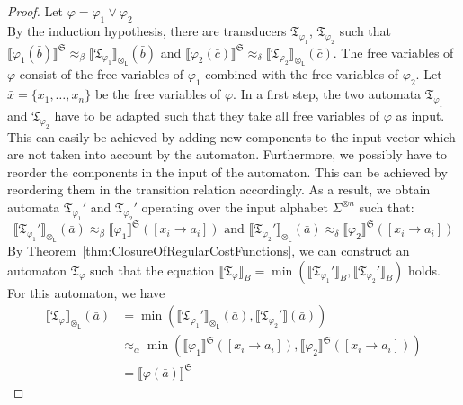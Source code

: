 \documentclass{LMCS}
\newcommand{\automatonT}{\mathfrak T}
\newcommand{\semantics}[1]{\llbracket#1\rrbracket}
\newcommand{\costEquiv}[1][\alpha]{\approx_{#1}}
\newcommand{\padprodL}{\otimes_{\mathsf{L}}}
\newcommand{\alphVector}[2]{#1^{\otimes #2}}
\newcommand{\structureS}{\mathfrak S}
\newcommand{\inductionstep}[1]{\item[\textbf{(induction step)}]
#1 \\}
\begin{document}
\begin{proof}
\inductionstep{Let $\varphi = \varphi_1 \vee \varphi_2$}
By the induction hypothesis, there are transducers $\automatonT_{\varphi_1}$,
$\automatonT_{\varphi_2}$ such that $\semantics{\varphi_1(\bar b)}^\structureS
\costEquiv[\beta] \semantics{\automatonT_{\varphi_1}}_{\padprodL}
(\bar b)$ and $\semantics{\varphi_2(\bar c)}^\structureS
\costEquiv[\delta] \semantics{\automatonT_{\varphi_2}}_{\padprodL}(\bar c)$. The
free variables of $\varphi$ consist of the free variables of $\varphi_1$
combined with the free variables of $\varphi_2$. Let $\bar x =
\{x_1,\ldots,x_n\}$ be the free variables of $\varphi$. In a
first step, the two automata $\automatonT_{\varphi_1}$ and
$\automatonT_{\varphi_2}$ have to be adapted such that they take all free
variables of $\varphi$ as input. This can easily be achieved by adding new
components to the input vector which are not taken into account by the
automaton. Furthermore, we possibly have to reorder the components in the input
of the automaton. This can be achieved by reordering them in the transition
relation accordingly. As a result, we obtain automata $\automatonT_{\varphi_1}'$
and $\automatonT_{\varphi_2}'$ operating over the input alphabet
$\alphVector{\Sigma}{n}$ such that:
\[
  \semantics{\automatonT_{\varphi_1}'}_{\padprodL}(\bar a)
  \costEquiv[\beta] \semantics{\varphi_1}^\structureS([x_i \to a_i])
  \text{ and }
  \semantics{\automatonT_{\varphi_2}'}_{\padprodL}(\bar a)
  \costEquiv[\delta] \semantics{\varphi_2}^\structureS([x_i \to a_i])
\]
By Theorem~\ref{thm:ClosureOfRegularCostFunctions}, we can construct an
automaton $\automatonT_{\varphi}$ such that the equation
$\semantics{\automatonT_{\varphi}}_B =
\min(\semantics{\automatonT_{\varphi_1}'}_B,\semantics{\automatonT_{\varphi_2}'}
_B)$ holds. For this automaton, we have
\begin{align*}
 \semantics{\automatonT_{\varphi}}_{\padprodL}(\bar a) 
   &= \min\left(
     \semantics{\automatonT_{\varphi_1}'}_{\padprodL}(\bar a),
     \semantics{\automatonT_{ \varphi_2 }'} (\bar a)
    \right) \\
	&\costEquiv 
	\min\left( 
	 \semantics{\varphi_1}^\structureS([x_i \to a_i]),
     \semantics{\varphi_2}^\structureS([x_i \to a_i]) 
    \right) \\
    &= \semantics{\varphi(\bar a)}^\structureS
\end{align*}


\end{proof}
\end{document}
